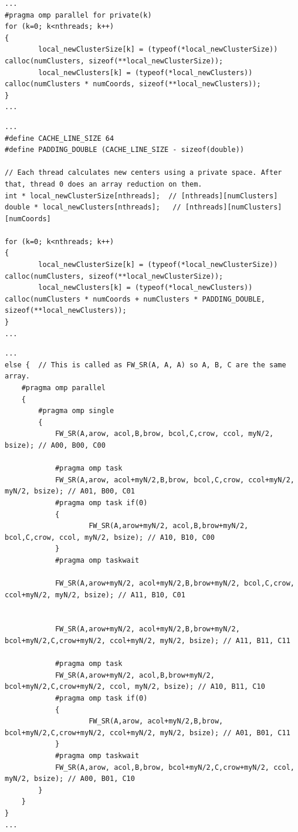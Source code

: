 \documentclass{article}
\begin{document}
\begin{lstlisting}[caption={Kmeans First Touch}, style=CStyle, label={lst:kmeans-first-touch}]
...
#pragma omp parallel for private(k)
for (k=0; k<nthreads; k++)
{
        local_newClusterSize[k] = (typeof(*local_newClusterSize)) calloc(numClusters, sizeof(**local_newClusterSize));
        local_newClusters[k] = (typeof(*local_newClusters)) calloc(numClusters * numCoords, sizeof(**local_newClusters));
}
... 
\end{lstlisting}

\begin{lstlisting}[caption={Kmeans Zero Padding}, style=CStyle, label={lst:kmeans-zero-padding}]
...
#define CACHE_LINE_SIZE 64
#define PADDING_DOUBLE (CACHE_LINE_SIZE - sizeof(double))

// Each thread calculates new centers using a private space. After that, thread 0 does an array reduction on them.
int * local_newClusterSize[nthreads];  // [nthreads][numClusters] 
double * local_newClusters[nthreads];   // [nthreads][numClusters][numCoords]

for (k=0; k<nthreads; k++)
{
        local_newClusterSize[k] = (typeof(*local_newClusterSize)) calloc(numClusters, sizeof(**local_newClusterSize));
        local_newClusters[k] = (typeof(*local_newClusters)) calloc(numClusters * numCoords + numClusters * PADDING_DOUBLE, sizeof(**local_newClusters));
}
... 
\end{lstlisting}

\begin{lstlisting}[caption={FW Recursive}, style=CStyle, label={lst:fw-rec}]
...
else {  // This is called as FW_SR(A, A, A) so A, B, C are the same array.
    #pragma omp parallel
    {
        #pragma omp single
        {
            FW_SR(A,arow, acol,B,brow, bcol,C,crow, ccol, myN/2, bsize); // A00, B00, C00

            #pragma omp task
            FW_SR(A,arow, acol+myN/2,B,brow, bcol,C,crow, ccol+myN/2, myN/2, bsize); // A01, B00, C01
            #pragma omp task if(0)
            {
                    FW_SR(A,arow+myN/2, acol,B,brow+myN/2, bcol,C,crow, ccol, myN/2, bsize); // A10, B10, C00
            }
            #pragma omp taskwait

            FW_SR(A,arow+myN/2, acol+myN/2,B,brow+myN/2, bcol,C,crow, ccol+myN/2, myN/2, bsize); // A11, B10, C01


            FW_SR(A,arow+myN/2, acol+myN/2,B,brow+myN/2, bcol+myN/2,C,crow+myN/2, ccol+myN/2, myN/2, bsize); // A11, B11, C11

            #pragma omp task
            FW_SR(A,arow+myN/2, acol,B,brow+myN/2, bcol+myN/2,C,crow+myN/2, ccol, myN/2, bsize); // A10, B11, C10
            #pragma omp task if(0)
            {
                    FW_SR(A,arow, acol+myN/2,B,brow, bcol+myN/2,C,crow+myN/2, ccol+myN/2, myN/2, bsize); // A01, B01, C11
            }
            #pragma omp taskwait
            FW_SR(A,arow, acol,B,brow, bcol+myN/2,C,crow+myN/2, ccol, myN/2, bsize); // A00, B01, C10
        }
    }
}
...
\end{lstlisting}
\end{document}
